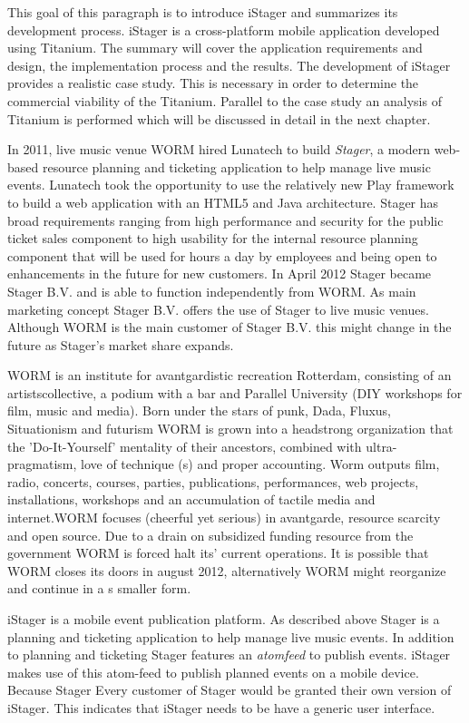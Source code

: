 This goal of this paragraph is to introduce iStager and summarizes its development process. iStager is a cross-platform mobile application developed using Titanium. The summary will cover the application requirements and design, the implementation process and the results. 
The development of iStager provides a realistic case study. This is necessary in order to determine the commercial viability of the Titanium. Parallel to the case study an analysis of Titanium is performed which will be discussed in detail in the next chapter.

In 2011, live music venue WORM hired Lunatech to build \emph{Stager}, a modern web-based resource planning and ticketing application to help manage live music events. Lunatech took the opportunity to use the relatively new Play framework to build a web application with an HTML5 and Java architecture. Stager has broad requirements ranging from high performance and security for the public ticket sales component to high usability for the internal resource planning component that will be used for hours a day by employees and being open to enhancements in the future for new customers. \cite{Lunatech2011} In April 2012 Stager became Stager B.V. and is able to function independently from WORM. As main marketing concept Stager B.V. offers the use of Stager  to live music venues. Although WORM is the main customer of Stager B.V. this might change in the future as Stager's market share expands. 

WORM is an institute for avantgardistic recreation Rotterdam, consisting of an artistscollective, a podium with a bar and Parallel University (DIY workshops for film, music and media). Born under the stars of punk, Dada, Fluxus, Situationism and futurism WORM is grown into a headstrong organization that the 'Do-It-Yourself' mentality of their ancestors, combined with ultra-pragmatism, love of technique (s) and proper accounting. Worm outputs film, radio, concerts, courses, parties, publications, performances, web projects, installations, workshops and an accumulation of tactile media and internet.WORM focuses (cheerful yet serious) in avantgarde, resource scarcity and open source. \cite{WORM2012} Due to a drain on subsidized funding resource from the government WORM is forced halt its' current operations. It is possible that WORM closes its doors in august 2012, alternatively WORM might reorganize and continue in a s smaller form.

iStager is a mobile event publication platform. As described above Stager is a planning and ticketing application to help manage live music events. In addition to planning and ticketing Stager features an \emph{atomfeed} to publish events. iStager makes use of this atom-feed to publish planned events on a mobile device. Because Stager
Every customer of Stager would be granted their own version of iStager. This indicates that iStager needs to be have a generic user interface.


